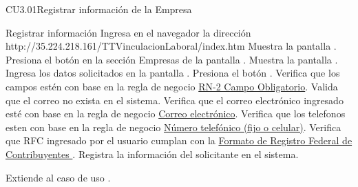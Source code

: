 \begin{UseCase}{CU3.01}{Registrar información de la Empresa}
{\begin{itemize}
			\end{itemize}
	     }
\end{UseCase}
	
	\begin{UCtrayectoria}{Registrar información }
	    \UCpaso[\UCactor] Ingresa en el navegador la dirección http://35.224.218.161/TTVinculacionLaboral/index.htm
	    \UCpaso[\UCsist] Muestra la pantalla .
		\UCpaso[\UCactor] Presiona el botón  en la sección Empresas de la pantalla .
		\UCpaso[\UCsist] Muestra la pantalla . 
		\UCpaso[\UCactor] Ingresa los datos solicitados en la pantalla .
		\UCpaso[\UCactor] Presiona el botón . 
		\UCpaso[\UCsist] Verifica que los campos estén con base en la regla de negocio \hyperlink{RN2}{RN-2 Campo Obligatorio}. 
		\UCpaso[\UCsist] Valida que el correo no exista en el sistema.
			\UCpaso[\UCsist] Verifica que el correo electrónico ingresado esté con base en la regla de negocio \hyperlink{RN13}{Correo electrónico}. 
		\UCpaso[\UCsist] Verifica que los telefonos esten con base en la regla de negocio \hyperlink{RN10}{Número telefónico (fijo o celular)}. 
		\UCpaso[\UCsist] Verifica que RFC ingresado por el usuario cumplan con la \hyperlink{RN8}{Formato de Registro Federal de Contribuyentes } . 
        \UCpaso[\UCsist] Registra la información del solicitante en el sistema.

		\UCpaso[\UCsist] Extiende al caso de uso .

		
	\end{UCtrayectoria}
	

